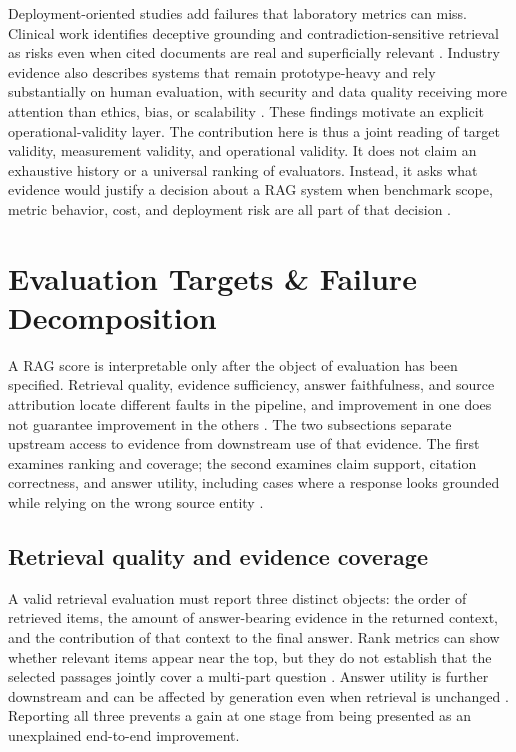 \documentclass[a4paper,11pt]{article}
\begin{document}
Deployment-oriented studies add failures that laboratory metrics can miss. Clinical work identifies deceptive grounding and contradiction-sensitive retrieval as risks even when cited documents are real and superficially relevant \citep{Caruzzo2026Deceptive,Javadi2025Contradictions}. Industry evidence also describes systems that remain prototype-heavy and rely substantially on human evaluation, with security and data quality receiving more attention than ethics, bias, or scalability \citep{Brehme2025Retrieval}. These findings motivate an explicit operational-validity layer. The contribution here is thus a joint reading of target validity, measurement validity, and operational validity. It does not claim an exhaustive history or a universal ranking of evaluators. Instead, it asks what evidence would justify a decision about a RAG system when benchmark scope, metric behavior, cost, and deployment risk are all part of that decision \citep{Cahoon2025Optimizing,Kovalskii2026Domain,Bang2026Feedback}.
\section{Evaluation Targets \& Failure Decomposition}


A RAG score is interpretable only after the object of evaluation has been specified. Retrieval quality, evidence sufficiency, answer faithfulness, and source attribution locate different faults in the pipeline, and improvement in one does not guarantee improvement in the others \citep{Taiwo2026Evaluating,Ding2026Attribution,Caruzzo2026Deceptive}. The two subsections separate upstream access to evidence from downstream use of that evidence. The first examines ranking and coverage; the second examines claim support, citation correctness, and answer utility, including cases where a response looks grounded while relying on the wrong source entity \citep{Miao2026Multi,Belinchon2026Effect,Nematov2025Source}.
\subsection{Retrieval quality and evidence coverage}


A valid retrieval evaluation must report three distinct objects: the order of retrieved items, the amount of answer-bearing evidence in the returned context, and the contribution of that context to the final answer. Rank metrics can show whether relevant items appear near the top, but they do not establish that the selected passages jointly cover a multi-part question \citep{Taiwo2026Evaluating,Kovalskii2026Domain}. Answer utility is further downstream and can be affected by generation even when retrieval is unchanged \citep{Miao2026Multi,Ding2026Attribution}. Reporting all three prevents a gain at one stage from being presented as an unexplained end-to-end improvement.
\end{document}

